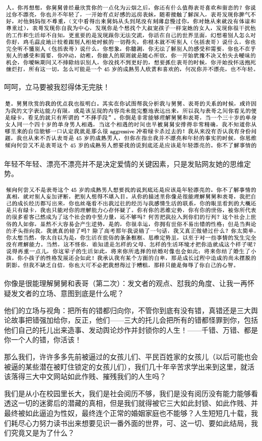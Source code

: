 \documentclass[9pt, b5paper]{article}
\begin{document}
\begin{center}
\includegraphics[width=.9\linewidth]{./pic/p1p109-5.png}
\end{center}

呵呵，立马要被我怼得体无完肤！

\begin{center}
\includegraphics[width=.9\linewidth]{./pic/p1p114-4.png}
\end{center}

年轻不年轻、漂亮不漂亮并不是决定爱情的关键因素，只是发贴网友她的思维定势。

\begin{center}
\includegraphics[width=.9\linewidth]{./pic/p1p114-5.png}
\end{center}

你像是很能理解舅舅和表哥（第二次）：发文者的观点、怼我的角度、让我一再怀疑发文者的立场、意图到底是什么呢？


他们的立场与视角：把所有的错都归向你，不管你到底有没有错，真错还是三大舆论故事把错强加给你，反正，他们——三大的托儿会把所有的错都怪罪到你，包括他们自己的托儿出来造事、发动舆论炒作并封锁你的人生！——千错、万错、都是你一个人的错，你活该！

那么我们，许许多多先前被逼过的女孩儿们、平民百姓家的女孩儿（以后可能也会被逼的某些潜在被盯住锁定的女孩儿们），我们几十年辛苦求学出来到这里，就活该落得三大中文网站如此作贱、摧残我们的人生吗？

我们是从小在校园里长大，我们是社会阅历不够，我们是没有阅历没有能力能够看透这一切的迷雾后的潜藏的真相，但是我们就得被它三大如此封锁、如此作贱、并最终被如此逼迫为性奴，最终连个正常的婚姻家庭也不能够？人生短短几十载，我们耗尽心力努力读书出来想要见识一番外面的世界，可、这一切、要如此结局，我们究竟又是为了什么？
\end{document}
